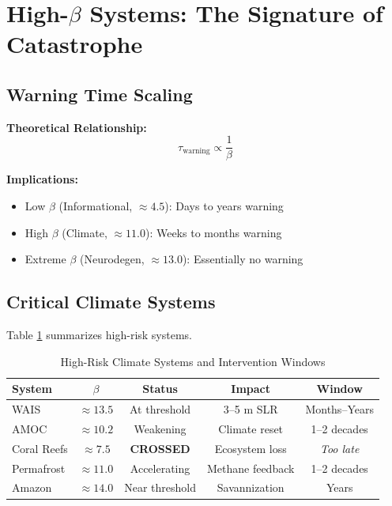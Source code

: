 \documentclass[11pt,a4paper]{article}
\begin{document}
\section{High-$\beta$ Systems: The Signature of Catastrophe}

\subsection{Warning Time Scaling}

\textbf{Theoretical Relationship:}
\begin{equation}
\tau_{\text{warning}} \propto \frac{1}{\beta}
\end{equation}

\textbf{Implications:}
\begin{itemize}
\item Low $\beta$ (Informational, $\approx 4.5$): Days to years warning
\item High $\beta$ (Climate, $\approx 11.0$): Weeks to months warning
\item Extreme $\beta$ (Neurodegen, $\approx 13.0$): Essentially no warning
\end{itemize}

\subsection{Critical Climate Systems}

Table \ref{tab:climate_risk} summarizes high-risk systems.

\begin{table}[h]
\centering
\caption{High-Risk Climate Systems and Intervention Windows}
\label{tab:climate_risk}
\begin{tabular}{lcccc}
\toprule
\textbf{System} & \textbf{$\beta$} & \textbf{Status} & \textbf{Impact} & \textbf{Window} \\
\midrule
WAIS & $\approx 13.5$ & At threshold & 3--5 m SLR & Months--Years \\
AMOC & $\approx 10.2$ & Weakening & Climate reset & 1--2 decades \\
Coral Reefs & $\approx 7.5$ & \textbf{CROSSED} & Ecosystem loss & \textit{Too late} \\
Permafrost & $\approx 11.0$ & Accelerating & Methane feedback & 1--2 decades \\
Amazon & $\approx 14.0$ & Near threshold & Savannization & Years \\
\bottomrule
\end{tabular}
\end{table}
\end{document}

